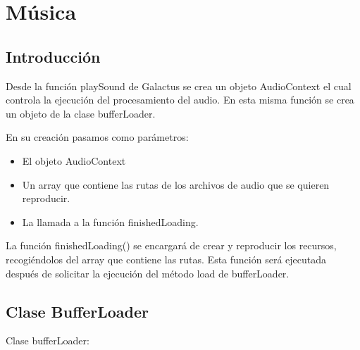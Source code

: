 \section{Música}
\label{sec:musica}

\subsection{Introducción}
\label{subsection:intro_musica}

Desde la función playSound de Galactus se crea un objeto AudioContext  el cual controla la ejecución del procesamiento del audio.
En esta misma función se crea un objeto de la clase bufferLoader. 

En su creación pasamos como parámetros: 
\begin{itemize}
 \item El objeto AudioContext
 \item Un array que contiene las rutas de los archivos de audio que se quieren reproducir.
 \item La llamada a la función  finishedLoading.
\end{itemize}

La función finishedLoading() se encargará de crear y reproducir los recursos, recogiéndolos del array que contiene las rutas. 
Esta función será ejecutada después de solicitar la ejecución del método load de bufferLoader.

\subsection{Clase BufferLoader}
\label{subsection:buffer_loader}
Clase bufferLoader: 